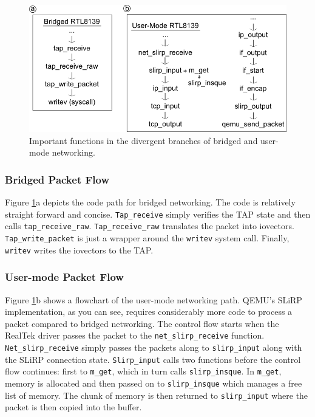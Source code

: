 \begin{figure}[!ht]
	\centering
		\includegraphics[scale=0.6]{codepath2_alt}
	\caption{Important functions in the divergent branches of bridged and user-mode networking.}
	\label{fig:codepath2}
\end{figure}
\subsubsection{Bridged Packet Flow}
Figure \ref{fig:codepath2}a depicts the code path for bridged networking.
The code is relatively straight forward and concise.
\texttt{Tap\_receive} simply verifies the TAP state and then calls \texttt{tap\_receive\_raw}.
\texttt{Tap\_receive\_raw} translates the packet into iovectors.
\texttt{Tap\_write\_packet} is just a wrapper around the \texttt{writev} system call.
Finally, \texttt{writev} writes the iovectors to the TAP.

\subsubsection{User-mode Packet Flow}

Figure \ref{fig:codepath2}b shows a flowchart of the user-mode networking path.
QEMU's SLiRP implementation, as you can see, requires considerably more code to process a packet compared to bridged networking.
The control flow starts when the RealTek driver passes the packet to the \texttt{net\_slirp\_receive} function.
\texttt{Net\_slirp\_receive} simply passes the packets along to \texttt{slirp\_input} along with the SLiRP connection state.
\texttt{Slirp\_input} calls two functions before the control flow continues: first to \texttt{m\_get}, which in turn calls \texttt{slirp\_insque}.
In \texttt{m\_get}, memory is allocated and then passed on to \texttt{slirp\_insque} which manages a free list of memory.
The chunk of memory is then returned to \texttt{slirp\_input} where the packet is then copied into the buffer.

